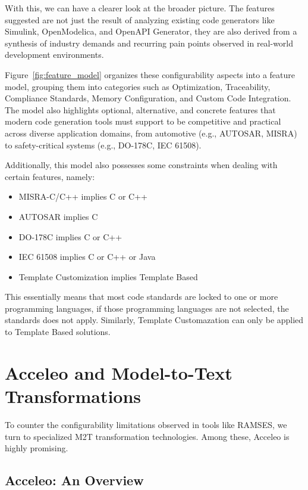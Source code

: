 With this, we can have a clearer look at the broader picture. The features suggested are not just the result of analyzing existing code generators like Simulink, OpenModelica, and OpenAPI Generator, they are also derived from a synthesis of industry demands and recurring pain points observed in real-world development environments.

Figure~\ref{fig:feature_model} organizes these configurability aspects into a feature model, grouping them into categories such as Optimization, Traceability, Compliance Standards, Memory Configuration, and Custom Code Integration. The model also highlights optional, alternative, and concrete features that modern code generation tools must support to be competitive and practical across diverse application domains, from automotive (e.g., \gls{AUTOSAR}, \gls{MISRA}) to safety-critical systems (e.g., DO-178C, \gls{IEC} 61508).

Additionally, this model also possesses some constraints when dealing with certain features, namely:

\begin{itemize} 
	\item \gls{MISRA}-C/C++ implies C or C++
	\item \gls{AUTOSAR} implies C
	\item DO-178C implies C or C++
	\item \gls{IEC} 61508 implies C or C++ or Java
	\item Template Customization implies Template Based
\end{itemize}

This essentially means that most code standards are locked to one or more programming languages, if those programming languages are not selected, the standards does not apply. Similarly, Template Customazation can only be applied to Template Based solutions.

\section{Acceleo and Model-to-Text Transformations} \label{sec:folders_and_files}

To counter the configurability limitations observed in tools like \gls{RAMSES}, we turn to specialized \gls{M2T} transformation technologies. Among these, Acceleo is highly promising.

\subsection*{Acceleo: An Overview}

